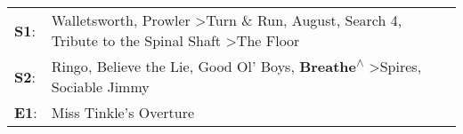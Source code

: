 \begin{supertabular}{p{0.03\textwidth}p{0.92\textwidth}}
 \textbf{S1}:  &  Walletsworth\textsuperscript{}, \enspace Prowler\textsuperscript{} \textgreater \enspace Turn \& Run\textsuperscript{}, \enspace August\textsuperscript{}, \enspace Search 4\textsuperscript{}, \enspace Tribute to the Spinal Shaft\textsuperscript{} \textgreater \enspace The Floor\textsuperscript{}  \enspace  \\
 \textbf{S2}:  &                                              Ringo\textsuperscript{}, \enspace Believe the Lie\textsuperscript{}, \enspace Good Ol' Boys\textsuperscript{}, \enspace \textbf{Breathe\textsuperscript{$\wedge$}} \textgreater \enspace Spires\textsuperscript{}, \enspace Sociable Jimmy\textsuperscript{}  \enspace  \\
 \textbf{E1}:  &                                                                                                                                                                                                                                                                  Miss Tinkle's Overture\textsuperscript{}  \enspace  \\
\end{supertabular}
